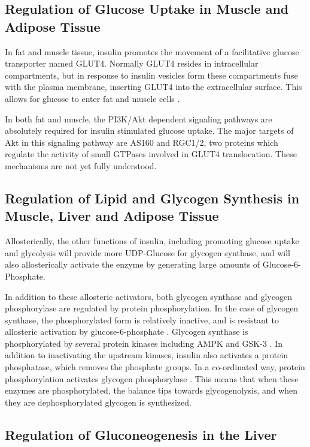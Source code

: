 \documentclass{tufte-handout}
\begin{document}
\subsection{Regulation of Glucose Uptake in Muscle and Adipose Tissue}

In fat and muscle tissue, insulin promotes the movement of a facilitative glucose transporter named GLUT4.  Normally GLUT4 resides in intracellular compartments, but in response to insulin vesicles form these compartments fuse with the plasma membrane, inserting GLUT4 into the extracellular surface.  This allows for glucose to enter fat and muscle cells \cite{Leto2012}.

In both fat and muscle, the PI3K/Akt dependent signaling pathways are absolutely required for insulin stimulated glucose uptake.  The major targets of Akt in this signaling pathway are AS160 and RGC1/2, two proteins which regulate the activity of small GTPases involved in GLUT4 translocation.  These mechanisms are not yet fully understood.

\subsection{Regulation of Lipid and Glycogen Synthesis in Muscle, Liver and Adipose Tissue}

Allosterically, the other functions of insulin, including promoting glucose uptake and glycolysis will provide more UDP-Glucose for glycogen synthase, and will also allosterically activate the enzyme by generating large amounts of Glucose-6-Phosphate.  

In addition to these allosteric activators, both glycogen synthase and glycogen phosphorylase are regulated by protein phosphorylation.  In the case of glycogen synthase, the phosphorylated form is relatively inactive, and is resistant to allosteric activation by glucose-6-phosphate \cite{Friedman1963}.  Glycogen synthase is phosphorylated by several protein kinases including AMPK and GSK-3 \cite{Parker1982}.  In addition to inactivating the upstream kinases, insulin also activates a protein phosphatase, which removes the phosphate groups.  In a co-ordinated way, protein phosphorylation activates glycogen phosphorylase \cite{Krebs1964}.  This means that when these enzymes are phosphorylated, the balance tips towards glycogenolysis, and when they are dephosphorylated glycogen is synthesized.

\subsection{Regulation of Gluconeogenesis in the Liver}
\end{document}

